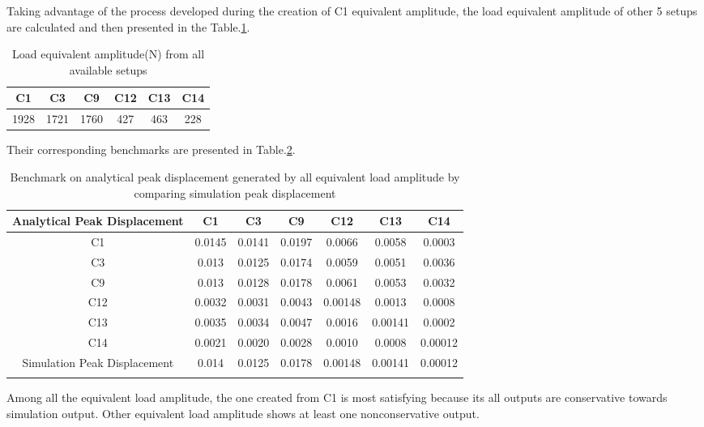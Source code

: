 Taking advantage of the process developed during the creation of C1 equivalent amplitude, the load equivalent amplitude of other 5 setups are calculated and then presented in the Table.\ref{tab:allLoadEquivalentAmplitude}.

\begin{table}[h!]
    \centering
    \caption{Load equivalent amplitude(N) from all available setups}
    \begin{tabular}{cccccc}
        \hline
        C1 & C3 & C9 & C12 & C13 & C14 \\
        \hline
        1928 & 1721 & 1760 & 427 & 463 & 228 \\
        \hline
    \end{tabular}
    \label{tab:allLoadEquivalentAmplitude}
\end{table}

Their corresponding benchmarks are presented in Table.\ref{tab:allBenchmark}.

\begin{table}[h!]
    \centering
    \caption{Benchmark on analytical peak displacement generated by all equivalent load amplitude by comparing simulation peak displacement}
    \begin{tabular}{ccccccc}
        \hline
        Analytical Peak Displacement & C1 & C3 & C9 & C12 & C13 & C14 \\
        \hline
        C1 & 0.0145 & 0.0141 & 0.0197 & 0.0066 & 0.0058 & 0.0003 \\
        C3 & 0.013 & 0.0125 & 0.0174 & 0.0059 & 0.0051 & 0.0036 \\
        C9 & 0.013 & 0.0128 & 0.0178 & 0.0061 & 0.0053 & 0.0032 \\
        C12 & 0.0032 & 0.0031 & 0.0043 & 0.00148 & 0.0013 & 0.0008 \\
        C13 & 0.0035 & 0.0034 & 0.0047 & 0.0016 & 0.00141 & 0.0002 \\
        C14 & 0.0021 & 0.0020 & 0.0028 & 0.0010 & 0.0008 & 0.00012 \\
        \hline
        Simulation Peak Displacement & 0.014 & 0.0125 & 0.0178 & 0.00148 & 0.00141 & 0.00012 \\
        \hline
        \label{tab:allBenchmark}
    \end{tabular}
\end{table}

Among all the equivalent load amplitude, the one created from C1 is most satisfying because its all outputs are conservative towards simulation output. Other equivalent load amplitude shows at least one nonconservative output. 

